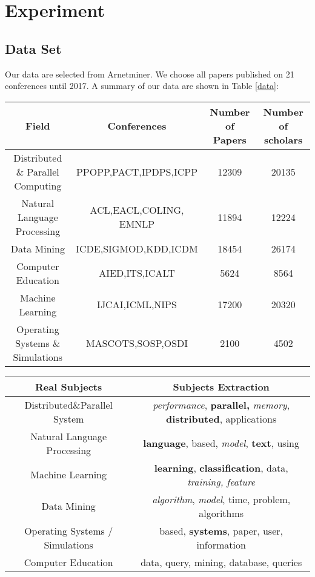 \documentclass[conference]{IEEEtran}
\begin{document}
\section{Experiment}
\subsection{Data Set}
Our data are selected from Arnetminer\cite{tang2008arnetminer}. We choose all papers published on 21 conferences until 2017. A summary of our data are shown in Table \ref{data}:
\begin{table*}[h]
\center
	\begin{tabular}{c|c|c|c}
	\hline
	\hline
	\textbf{Field} & \textbf{Conferences} & \textbf{Number of Papers}&\textbf{Number of scholars}\\
	\hline
	\hline
	Distributed \& Parallel Computing & PPOPP,PACT,IPDPS,ICPP & 12309&20135\\
	\hline
	Natural Language Processing & ACL,EACL,COLING, EMNLP &11894&12224\\
	\hline
	Data Mining & ICDE,SIGMOD,KDD,ICDM&18454&26174\\
	\hline
	Computer Education & AIED,ITS,ICALT&5624&8564\\
	\hline
	Machine Learning &IJCAI,ICML,NIPS&17200
&20320\\
	\hline
	Operating Systems \& Simulations & MASCOTS,SOSP,OSDI&2100&4502\\
	\hline
	\hline
	\end{tabular}
	\caption{A summary of data.}
	\label{data}
\end{table*}
\begin{table*}[h]
\center
	\begin{tabular}{c|c}	
	\hline
	\hline
  Real Subjects & Subjects Extraction\\
  \hline
  \hline
    Distributed\&Parallel System & \emph{performance}, \textbf{parallel,}
  \emph{memory}, \textbf{distributed}, applications\\
  \hline
  Natural Language Processing & \textbf{language}, based, \emph{model},
  \textbf{text}, using\\
  \hline
  Machine Learning & \textbf{learning}, \textbf{classification}, data,
  \emph{training, feature}\\
  \hline
  Data Mining & \emph{algorithm}, \emph{model}, time, problem,
  algorithms\\
  \hline
  Operating Systems / Simulations & based, \textbf{systems}, paper,
  user, information\\
  \hline
  Computer Education & data, query, mining, database,
  queries\\
  \hline
  \hline
  \end{tabular}
  
 \caption{The Subject Extraction using LDA model.}
 \label{LDA}
  \end{table*}
\end{document}
